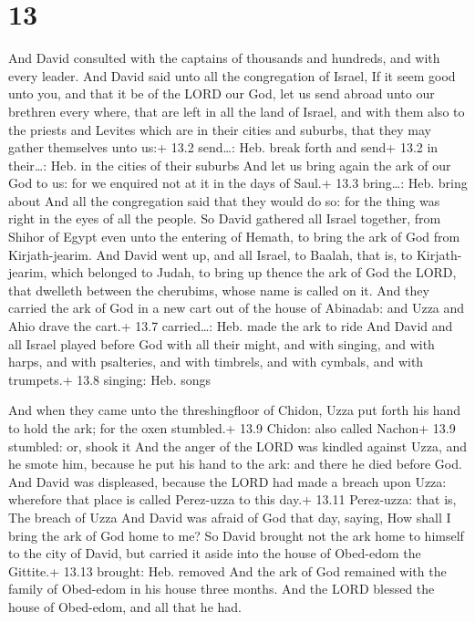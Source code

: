 \hypertarget{section-12}{%
\section{13}\label{section-12}}

 And David consulted with the captains of thousands and
hundreds, and with every leader.  And David said unto all
the congregation of Israel, If it seem good unto you, and that it be of
the LORD our God, let us send abroad unto our brethren every where, that
are left in all the land of Israel, and with them also to the priests
and Levites which are in their cities and suburbs, that they may gather
themselves unto us:+ 13.2 send\ldots: Heb. break forth and send+ 13.2 in
their\ldots: Heb. in the cities of their suburbs  And let us
bring again the ark of our God to us: for we enquired not at it in the
days of Saul.+ 13.3 bring\ldots: Heb. bring about  And all
the congregation said that they would do so: for the thing was right in
the eyes of all the people.  So David gathered all Israel
together, from Shihor of Egypt even unto the entering of Hemath, to
bring the ark of God from Kirjath-jearim.  And David went
up, and all Israel, to Baalah, that is, to Kirjath-jearim, which
belonged to Judah, to bring up thence the ark of God the LORD, that
dwelleth between the cherubims, whose name is called on it. 
And they carried the ark of God in a new cart out of the house of
Abinadab: and Uzza and Ahio drave the cart.+ 13.7 carried\ldots: Heb.
made the ark to ride  And David and all Israel played before
God with all their might, and with singing, and with harps, and with
psalteries, and with timbrels, and with cymbals, and with trumpets.+
13.8 singing: Heb. songs

 And when they came unto the threshingfloor of Chidon,
Uzza put forth his hand to hold the ark; for the oxen stumbled.+ 13.9
Chidon: also called Nachon+ 13.9 stumbled: or, shook it 
And the anger of the LORD was kindled against Uzza, and he smote him,
because he put his hand to the ark: and there he died before God.
 And David was displeased, because the LORD had made a
breach upon Uzza: wherefore that place is called Perez-uzza to this
day.+ 13.11 Perez-uzza: that is, The breach of Uzza  And
David was afraid of God that day, saying, How shall I bring the ark of
God home to me?  So David brought not the ark home to
himself to the city of David, but carried it aside into the house of
Obed-edom the Gittite.+ 13.13 brought: Heb. removed  And
the ark of God remained with the family of Obed-edom in his house three
months. And the LORD blessed the house of Obed-edom, and all that he
had.

